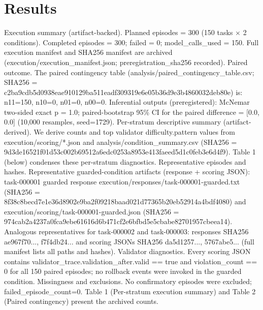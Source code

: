\documentclass[conference]{IEEEtran}
\begin{document}
\section{Results}
Execution summary (artifact-backed). Planned episodes = 300 (150 tasks \ensuremath{\times} 2 conditions). Completed episodes = 300; failed = 0; model\_calls\_used = 150. Full execution manifest and SHA256 manifest are archived (execution/execution\_manifest.json; preregistration\_sha256 recorded). Paired outcome. The paired contingency table (analysis/paired\_contingency\_table.csv; SHA256 = c2ba9cdb5d0938eae910129ba511eadf309319e6e05b36d9e3b4860032deb80e) is: n11=150, n10=0, n01=0, n00=0. Inferential outputs (preregistered): McNemar two-sided exact p = 1.0; paired-bootstrap 95\% CI for the paired difference = [0.0, 0.0] (10,000 resamples, seed=1729). Per-stratum descriptive summary (artifact-derived). We derive counts and top validator difficulty.pattern values from execution/scoring/*.json and analysis/condition\_summary.csv (SHA256 = 9d3de16521f01d53c002b69512a6edc0253a8953e413faeed5d1c0feb3e6d4f9). Table 1 (below) condenses these per-stratum diagnostics. Representative episodes and hashes. Representative guarded-condition artifacts (response + scoring JSON): task-000001 guarded response execution/responses/task-000001-guarded.txt (SHA256 = 8f38c8becd7e1e36d8902e9ba2f09218baad021d77365b20eb52914a4bdf4080) and execution/scoring/task-000001-guarded.json (SHA256 = 974cab2a4237a0fca9ebe61616d6b471cf2e6bfbd5e5cbabe82701957cbeea14). Analogous representatives for task-000002 and task-000003: responses SHA256 ae967f70..., f7f4db24... and scoring JSONs SHA256 da5d1257..., 5767abe5... (full manifest lists all paths and hashes). Validator diagnostics. Every scoring JSON contains validator\_trace.validation\_after.valid == true and violation\_count == 0 for all 150 paired episodes; no rollback events were invoked in the guarded condition. Missingness and exclusions. No confirmatory episodes were excluded; failed\_episode\_count=0. Table 1 (Per-stratum execution summary) and Table 2 (Paired contingency) present the archived counts.
\end{document}
